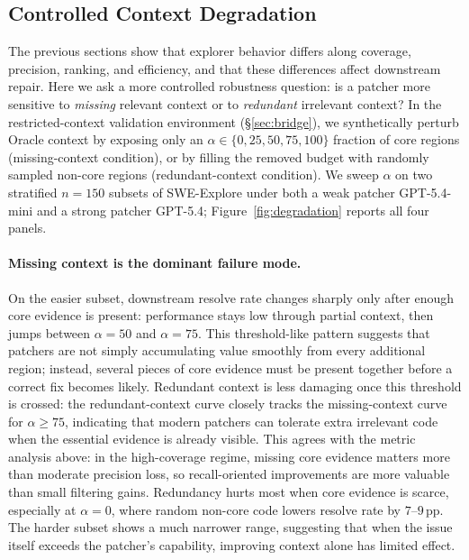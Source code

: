 \subsection{Controlled Context Degradation}
\label{sec:degradation}
\vspace{-1mm}
The previous sections show that explorer behavior differs along coverage, precision, ranking, and efficiency, and that these differences affect downstream repair. Here we ask a more controlled robustness question: is a patcher more sensitive to \emph{missing} relevant context or to \emph{redundant} irrelevant context? In the restricted-context validation environment (\S\ref{sec:bridge}), we synthetically perturb Oracle context by exposing only an $\alpha\in\{0,25,50,75,100\}$ fraction of core regions (missing-context condition), or by filling the removed budget with randomly sampled non-core regions (redundant-context condition). We sweep $\alpha$ on two stratified $n{=}150$ subsets of SWE-Explore under both a weak patcher GPT-5.4-mini and a strong patcher GPT-5.4; Figure~\ref{fig:degradation} reports all four panels.


\vspace{-3mm}
\paragraph{Missing context is the dominant failure mode.}
On the easier subset, downstream resolve rate changes sharply only after enough core evidence is present: performance stays low through partial context, then jumps between $\alpha{=}50$ and $\alpha{=}75$. This threshold-like pattern suggests that patchers are not simply accumulating value smoothly from every additional region; instead, several pieces of core evidence must be present together before a correct fix becomes likely. Redundant context is less damaging once this threshold is crossed: the redundant-context curve closely tracks the missing-context curve for $\alpha\geq75$, indicating that modern patchers can tolerate extra irrelevant code when the essential evidence is already visible. This agrees with the metric analysis above: in the high-coverage regime, missing core evidence matters more than moderate precision loss, so recall-oriented improvements are more valuable than small filtering gains. Redundancy hurts most when core evidence is scarce, especially at $\alpha{=}0$, where random non-core code lowers resolve rate by $7$--$9$\,pp. The harder subset shows a much narrower range, suggesting that when the issue itself exceeds the patcher's capability, improving context alone has limited effect.

